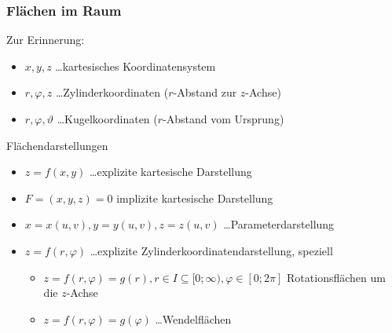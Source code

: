 \documentclass[a4paper]{scrartcl}
\begin{document}
\subsubsection{Flächen im Raum}
Zur Erinnerung:
\begin{itemize}
\item $x,y,z$ \dots kartesisches Koordinatensystem
\item $r,\varphi,z$ \dots Zylinderkoordinaten ($r$-Abstand zur $z$-Achse)
\item $r,\varphi,\vartheta$ \dots Kugelkoordinaten ($r$-Abstand vom Ursprung)
\end{itemize}
Flächendarstellungen
\begin{itemize}
\item $z=f(x,y)$ \dots explizite kartesische Darstellung
\item $F=(x,y,z) = 0$ implizite kartesische Darstellung
\item $x=x(u,v),y=y(u,v),z=z(u,v)$ \dots Parameterdarstellung
\item $z=f(r,\varphi)$ \dots explizite Zylinderkoordinatendarstellung, speziell
\begin{itemize}
\item $z=f(r,\varphi) = g(r), r \in I \subseteq [0;\infty), \varphi \in [0;2\pi]$ Rotationsflächen um die $z$-Achse
\item $z=f(r,\varphi) = g(\varphi)$ \dots Wendelflächen
\end{itemize}
\end{itemize}
\end{document}
